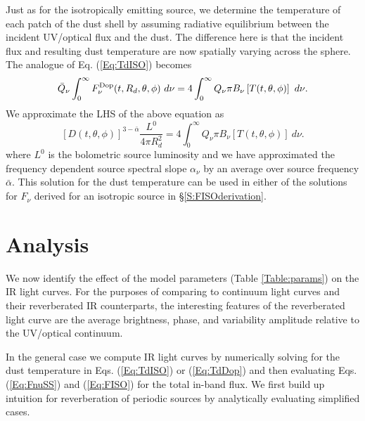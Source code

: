 Just as for the isotropically emitting source, we determine the temperature of
each patch of the dust shell by assuming radiative equilibrium between the
incident UV/optical flux and the dust. The difference here is that the
incident flux and resulting dust temperature are now spatially varying across
the sphere. The analogue of Eq. (\ref{Eq:TdISO}) becomes
\begin{equation}
\label{Eq:TdDop1}
\bar{Q}_{\nu} \int^{\infty}_{0}{F^{\rm{Dop}}_{\nu}(t, R_d, \theta, \phi)  \ d \nu } =   4 \int^{\infty}_{0}{Q_{\nu} \pi B_{\nu}\left[T(t,\theta, \phi)\right] \ d\nu}.
\end{equation}
We approximate the LHS of the above equation as
\begin{equation}
\label{Eq:TdDop}
\left[D(t, \theta, \phi)\right]^{3-\bar{\alpha}} \frac{L^0}{4 \pi R^2_d}  =   4 \int^{\infty}_{0}{Q_{\nu} \pi B_{\nu}\left[T(t,\theta, \phi)\right] \ d\nu}. 
\end{equation}
where $L^0$ is the bolometric source luminosity and we have approximated the
frequency dependent source spectral slope $\alpha_{\nu}$ by an average over
source frequency $\bar{\alpha}$. This solution for the dust temperature can be
used in either of the solutions for $F_{\nu}$ derived for an isotropic source
in \S \ref{S:FISOderivation}.










\section{Analysis}
\label{S:PDs}

We now identify the effect of the model parameters (Table \ref{Table:params})
on the IR light curves. For the purposes of comparing to continuum light
curves and their reverberated IR counterparts, the interesting features of the
reverberated light curve are the average brightness, phase, and
variability amplitude relative to the UV/optical continuum.

In the general case we compute IR light curves by numerically solving for the
dust temperature in Eqs. (\ref{Eq:TdISO}) or (\ref{Eq:TdDop}) and then
evaluating Eqs. (\ref{Eq:FnuSS}) and (\ref{Eq:FISO}) for the total in-band
flux. We first build up intuition for reverberation of periodic sources by
analytically evaluating simplified cases.








